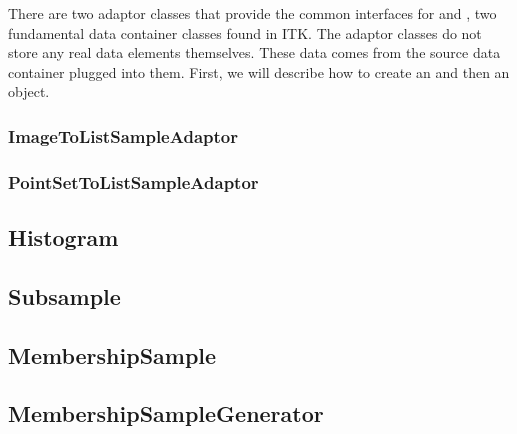 There are two adaptor classes that provide the common
 interfaces for  and
, two fundamental data container classes found in ITK. The
adaptor classes do not store any real data elements themselves. These data
comes from the source data container plugged into them. First, we will
describe how to create an
 and then an
 object.

\subsubsection{ImageToListSampleAdaptor}
\label{sec:ImageToListSampleAdaptor}

\ifitkFullVersion

\fi

\subsubsection{PointSetToListSampleAdaptor}
\label{sec:PointSetToListSampleAdaptor}

\ifitkFullVersion

\fi

\ifitkFullVersion

\fi


\subsection{Histogram}
\label{sec:Histogram}

\ifitkFullVersion

\fi

\subsection{Subsample}
\label{sec:Subsample}

\ifitkFullVersion

\fi

\subsection{MembershipSample}
\label{sec:MembershipSample}

\ifitkFullVersion

\fi

\subsection{MembershipSampleGenerator}
\label{sec:MembershipSampleGenerator}

